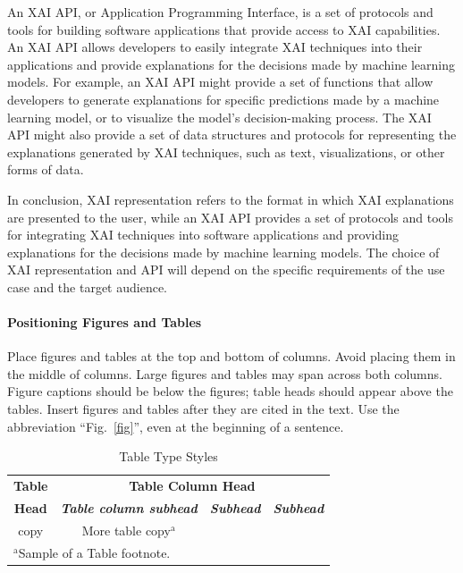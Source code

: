 \documentclass[conference]{IEEEtran}
\begin{document}
An XAI API, or Application Programming Interface, is a set of protocols and tools for building software applications that provide access to XAI capabilities. An XAI API allows developers to easily integrate XAI techniques into their applications and provide explanations for the decisions made by machine learning models. For example, an XAI API might provide a set of functions that allow developers to generate explanations for specific predictions made by a machine learning model, or to visualize the model's decision-making process. The XAI API might also provide a set of data structures and protocols for representing the explanations generated by XAI techniques, such as text, visualizations, or other forms of data.

In conclusion, XAI representation refers to the format in which XAI explanations are presented to the user, while an XAI API provides a set of protocols and tools for integrating XAI techniques into software applications and providing explanations for the decisions made by machine learning models. The choice of XAI representation and API will depend on the specific requirements of the use case and the target audience.
\paragraph{Positioning Figures and Tables} Place figures and tables at the top and 
bottom of columns. Avoid placing them in the middle of columns. Large 
figures and tables may span across both columns. Figure captions should be 
below the figures; table heads should appear above the tables. Insert 
figures and tables after they are cited in the text. Use the abbreviation 
``Fig.~\ref{fig}'', even at the beginning of a sentence.

\begin{table}[htbp]
\caption{Table Type Styles}
\begin{center}
\begin{tabular}{|c|c|c|c|}
\hline
\textbf{Table}&\multicolumn{3}{|c|}{\textbf{Table Column Head}} \\
\cline{2-4} 
\textbf{Head} & \textbf{\textit{Table column subhead}}& \textbf{\textit{Subhead}}& \textbf{\textit{Subhead}} \\
\hline
copy& More table copy$^{\mathrm{a}}$& &  \\
\hline
\multicolumn{4}{l}{$^{\mathrm{a}}$Sample of a Table footnote.}
\end{tabular}
\label{tab1}
\end{center}
\end{table}
\end{document}
